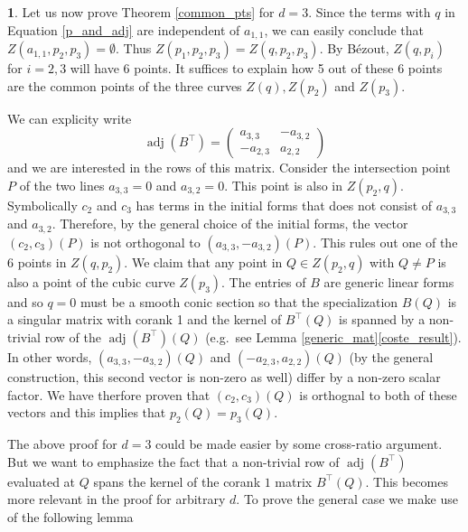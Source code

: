 \documentclass[a4paper,11pt]{amsart}%
\newcommand\adj{\operatorname{adj}}
\newcommand\pmat[1]{\begin{pmatrix} #1 \end{pmatrix}}
\theoremstyle{definition}
\newtheorem{none}[theorem]{}
\begin{document}
\begin{none}\label{common_pts_d=3}
Let us now prove Theorem \ref{common_pts} for $d=3$. 
Since the terms with $q$ in Equation \eqref{p_and_adj} are independent of $a_{1,1}$, we can easily conclude that $Z(a_{1,1},p_2,p_3)=\emptyset$.
Thus $Z(p_1,p_2,p_3)=Z(q,p_2,p_3)$. By Bézout, $Z(q,p_i)$ for $i=2,3$ will have $6$ points. It suffices to explain how 5 out of these 6 points are the common points of the three curves 
$Z(q), Z(p_2)$ and $Z(p_3)$. 

We can explicity write   
$$\adj(B^\top) = \pmat{a_{3,3} & -a_{3,2}\\ -a_{2,3} & a_{2,2}}$$
and we are interested in the rows of this matrix.
Consider the intersection point 
$P$ of the two lines $a_{3,3}=0$ and $a_{3,2}=0$. This point is also in $Z(p_2,q)$. 
Symbolically $c_2$ and $c_3$  has terms in the initial forms that does not consist of $a_{3,3}$ and $a_{3,2}$. Therefore, by the general choice of the initial forms, the vector $(c_2, c_3)(P)$ is not 
orthogonal to $(a_{3,3},-a_{3,2})(P)$. This rules out one of the $6$ points in $Z(q,p_2)$. We claim that any point in $Q\in Z(p_2,q)$ with $Q\ne P$ is also a point
of the cubic curve $Z(p_3)$. The entries of $B$ are generic linear forms and so $q=0$ must be a smooth conic section so that the specialization $B(Q)$ is a singular 
matrix with corank 1 and the kernel of $B^\top(Q)$ is spanned by a non-trivial row of the $\adj(B^\top)(Q)$ (e.g.\ see Lemma \ref{generic_mat}\ref{coste_result}). 
In other words, $(a_{3,3},-a_{3,2})(Q)$ and 
$(-a_{2,3},a_{2,2})(Q)$ (by the general construction, this second vector is non-zero as well) differ by a non-zero scalar factor. We have therfore proven that $(c_2,c_3)(Q)$ is orthognal to both of 
these vectors and this implies that $p_2(Q)=p_3(Q)$.
\end{none}

The above proof for $d=3$ could be made easier by some cross-ratio argument. But we want to emphasize the fact that a non-trivial row of $\adj(B^\top)$ evaluated at $Q$ spans the kernel of the corank 
$1$ matrix $B^\top(Q)$. This becomes more relevant in the proof for arbitrary $d$. To prove the general case we make use of the following lemma
\end{document}
